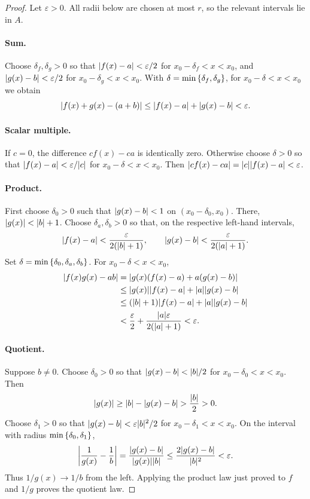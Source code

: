 \documentclass[11pt,a4paper]{amsart}
\begin{document}
\begin{proof}
  Let \(\varepsilon>0\). All radii below are chosen at most \(r\),
  so the relevant intervals lie in \(A\).

  \paragraph{Sum.}
  Choose \(\delta_f,\delta_g>0\) so that
  \(\abs{f(x)-a}<\varepsilon/2\) for \(x_0-\delta_f<x<x_0\),
  and \(\abs{g(x)-b}<\varepsilon/2\) for \(x_0-\delta_g<x<x_0\).
  With \(\delta=\min\set{\delta_f,\delta_g}\), for
  \(x_0-\delta<x<x_0\) we obtain
  \[
    \abs{f(x)+g(x)-(a+b)}
    \leq\abs{f(x)-a}+\abs{g(x)-b}<\varepsilon.
  \]

  \paragraph{Scalar multiple.}
  If \(c=0\), the difference \(cf(x)-ca\) is identically zero.
  Otherwise choose \(\delta>0\) so that
  \(\abs{f(x)-a}<\varepsilon/\abs{c}\) for \(x_0-\delta<x<x_0\).
  Then \(\abs{cf(x)-ca}=\abs{c}\abs{f(x)-a}<\varepsilon\).

  \paragraph{Product.}
  First choose \(\delta_0>0\) such that
  \(\abs{g(x)-b}<1\) on \((x_0-\delta_0,x_0)\). There,
  \(\abs{g(x)}<\abs{b}+1\). Choose \(\delta_a,\delta_b>0\)
  so that, on the respective left-hand intervals,
  \[
    \abs{f(x)-a}<\frac{\varepsilon}{2(\abs{b}+1)},
    \qquad
    \abs{g(x)-b}<\frac{\varepsilon}{2(\abs{a}+1)}.
  \]
  Set \(\delta=\min\set{\delta_0,\delta_a,\delta_b}\). For
  \(x_0-\delta<x<x_0\),
  \begin{align*}
    \abs{f(x)g(x)-ab}
    &=\abs{g(x)(f(x)-a)+a(g(x)-b)}\\
    &\leq\abs{g(x)}\abs{f(x)-a}+\abs{a}\abs{g(x)-b}\\
    &\leq(\abs{b}+1)\abs{f(x)-a}+\abs{a}\abs{g(x)-b}\\
    &<\frac\varepsilon2+
    \frac{\abs{a}\varepsilon}{2(\abs{a}+1)}<\varepsilon.
  \end{align*}

  \paragraph{Quotient.}
  Suppose \(b\neq0\). Choose \(\delta_0>0\) so that
  \(\abs{g(x)-b}<\abs{b}/2\) for \(x_0-\delta_0<x<x_0\).
  Then
  \[
    \abs{g(x)}\geq\abs{b}-\abs{g(x)-b}>\frac{\abs{b}}2>0.
  \]
  Choose \(\delta_1>0\) so that
  \(\abs{g(x)-b}<\varepsilon\abs{b}^2/2\) for
  \(x_0-\delta_1<x<x_0\). On the interval with radius
  \(\min\set{\delta_0,\delta_1}\),
  \[
    \abs*{\frac1{g(x)}-\frac1b}
    =\frac{\abs{g(x)-b}}{\abs{g(x)}\abs{b}}
    \leq\frac{2\abs{g(x)-b}}{\abs{b}^2}<\varepsilon.
  \]
  Thus \(1/g(x)\to1/b\) from the left. Applying the product law
  just proved to \(f\) and \(1/g\) proves the quotient law.


\end{proof}
\end{document}
